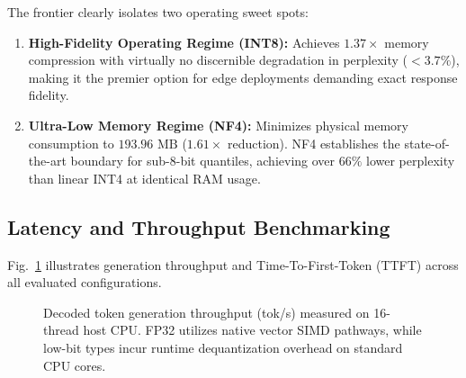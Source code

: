 \documentclass[conference]{IEEEtran}
\begin{document}
The frontier clearly isolates two operating sweet spots:
\begin{enumerate}
    \item \textbf{High-Fidelity Operating Regime (INT8):} Achieves $1.37\times$ memory compression with virtually no discernible degradation in perplexity ($<3.7\%$), making it the premier option for edge deployments demanding exact response fidelity.
    \item \textbf{Ultra-Low Memory Regime (NF4):} Minimizes physical memory consumption to $193.96\text{ MB}$ ($1.61\times$ reduction). NF4 establishes the state-of-the-art boundary for sub-8-bit quantiles, achieving over $66\%$ lower perplexity than linear INT4 at identical RAM usage.
\end{enumerate}

\subsection{Latency and Throughput Benchmarking}
Fig.~\ref{fig:throughput} illustrates generation throughput and Time-To-First-Token (TTFT) across all evaluated configurations. 

\begin{figure}[t]
\centering
{}
\caption{Decoded token generation throughput (tok/s) measured on 16-thread host CPU. FP32 utilizes native vector SIMD pathways, while low-bit types incur runtime dequantization overhead on standard CPU cores.}
\label{fig:throughput}
\end{figure}
\end{document}
